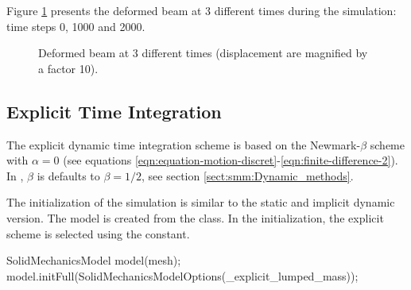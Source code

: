 Figure \ref{fig:smm:implicit:dynamic_solution} presents the deformed
beam at 3 different times during the simulation: time steps 0, 1000 and
2000.

\begin{figure}[!htb]
  \centering
  \setlength{\unitlength}{0.1\textwidth}

  \caption{Deformed beam at 3 different times (displacement are
    magnified by a factor 10).}
  \label{fig:smm:implicit:dynamic_solution}
\end{figure}

\subsection{Explicit Time Integration}

The explicit dynamic time integration scheme is based on the
Newmark-$\beta$ scheme with $\alpha=0$ (see equations
\ref{eqn:equation-motion-discret}-\ref{eqn:finite-difference-2}).  In
\akantu, $\beta$ is defaults to $\beta=1/2$, see section
\ref{sect:smm:Dynamic_methods}.

The initialization of the simulation is similar to the static and
implicit dynamic version.  The model is created from the
 class.  In the initialization, the explicit
scheme is selected using the  constant.

\begin{cpp}
SolidMechanicsModel model(mesh);
model.initFull(SolidMechanicsModelOptions(_explicit_lumped_mass));
\end{cpp}

